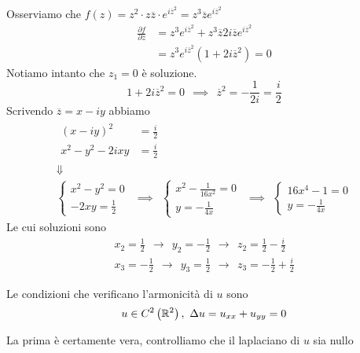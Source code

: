 Osserviamo che $f\left(z\right) = z^{2} \cdot z\overline{z} \cdot e^{i\overline{z}^{2}} = z^{3}\overline{z} e^{i\overline{z}^{2}}$
\begin{align*}
\frac{\partial f}{\partial \overline{z}} & = z^{3} e^{i\overline{z}^{2}} + z^{3}\overline{z} 2i\overline{z} e^{i\overline{z}^{2}}\\
 & = z^{3} e^{i\overline{z}^{2}}\left(1 + 2i\overline{z}^{2}\right) = 0
\end{align*}
Notiamo intanto che $z_{1} = 0$ è soluzione.
\begin{equation*}
1 + 2i\overline{z}^{2} = 0\ \ \implies \ \ \overline{z}^{2} = - \frac{1}{2i} = \frac{i}{2}
\end{equation*}
Scrivendo $\overline{z} = x - iy$ abbiamo
\begin{gather*}
\begin{aligned}
\left(x - iy\right)^{2} & = \frac{i}{2}\\
x^{2} - y^{2} - 2ixy & = \frac{i}{2}
\end{aligned}\\
\Downarrow \\
\begin{cases}
x^{2} - y^{2} = 0\\
- 2xy = \frac{1}{2}
\end{cases} \ \ \implies \ \ 
\begin{cases}
x^{2} - \frac{1}{16x^{2}} = 0\\
y = -\frac{1}{4x}
\end{cases} \ \ \implies \ \ 
\begin{cases}
16x^{4} - 1 = 0\\
y = -\frac{1}{4x}
\end{cases}
\end{gather*}
Le cui soluzioni sono
\begin{gather*}
x_{2} = \frac{1}{2} \ \ \rightarrow \ \ y_{2} = - \frac{1}{2} \ \ \rightarrow \ \ z_{2} = \frac{1}{2} - \frac{i}{2}\\
x_{3} = - \frac{1}{2} \ \ \rightarrow \ \ y_{3} = \frac{1}{2} \ \ \rightarrow \ \ z_{3} = - \frac{1}{2} + \frac{i}{2}
\end{gather*}
\Soluzione
\begin{defn}
Le condizioni che verificano l'armonicità di $u$ sono
\begin{equation}
u\in C^{2}\left(\RR ^{2}\right) ,\ \Delta u = u_{xx} + u_{yy} = 0
\end{equation}
\end{defn}
La prima è certamente vera, controlliamo che il laplaciano di $u$ sia nullo
